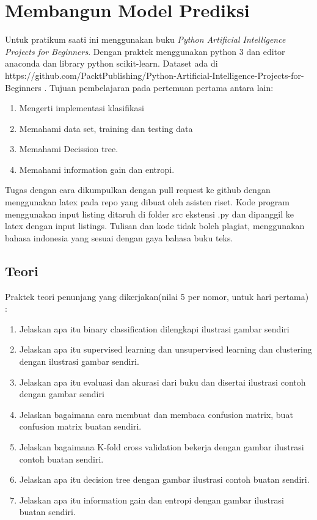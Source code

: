 \chapter{Membangun Model Prediksi}

Untuk pratikum saati ini menggunakan buku \textit{Python Artificial Intelligence Projects for Beginners}\cite{eckroth2018python}. Dengan praktek menggunakan python 3 dan editor anaconda dan library python scikit-learn.
Dataset ada di https://github.com/PacktPublishing/Python-Artificial-Intelligence-Projects-for-Beginners .
Tujuan pembelajaran pada pertemuan pertama antara lain:
\begin{enumerate}
\item
Mengerti implementasi klasifikasi
\item
Memahami data set, training dan testing data
\item
Memahami Decission tree.
\item
Memahami information gain dan entropi.
\end{enumerate}
Tugas dengan cara dikumpulkan dengan pull request ke github dengan menggunakan latex pada repo yang dibuat oleh asisten riset. Kode program menggunakan input listing ditaruh di folder src ekstensi .py dan dipanggil ke latex dengan input listings. Tulisan dan kode tidak boleh plagiat, menggunakan bahasa indonesia yang sesuai dengan gaya bahasa buku teks.

\section{Teori}
Praktek teori penunjang yang dikerjakan(nilai 5 per nomor, untuk hari pertama) :
\begin{enumerate}
\item
Jelaskan apa itu binary classification dilengkapi ilustrasi gambar sendiri
\item
Jelaskan apa itu supervised learning dan unsupervised learning dan clustering dengan ilustrasi gambar sendiri.
\item
Jelaskan apa itu evaluasi dan akurasi dari buku dan disertai ilustrasi contoh dengan gambar sendiri
\item
Jelaskan bagaimana cara membuat dan membaca confusion matrix, buat confusion matrix buatan sendiri.
\item
Jelaskan bagaimana K-fold cross validation bekerja dengan gambar ilustrasi contoh buatan sendiri.
\item
Jelaskan apa itu decision tree dengan gambar ilustrasi contoh buatan sendiri.
\item
Jelaskan apa itu information gain dan entropi dengan gambar ilustrasi buatan sendiri.
\end{enumerate}

